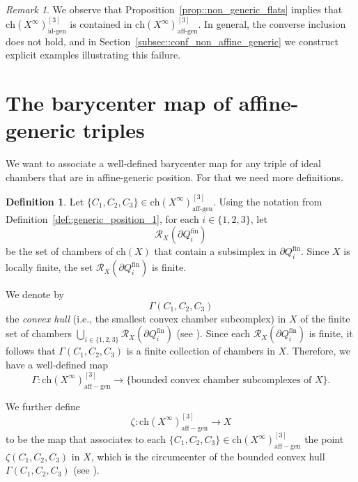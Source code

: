 \documentclass[11pt]{amsart}
\newcommand{\affgen}{\Ch(X^\infty)_{\mathrm{aff-gen}}^{[3]}}
\newcommand{\Ch}{\mathrm{ch}}
\theoremstyle{plain}
\theoremstyle{definition}
\newtheorem{Def}[thm]{Definition}
\theoremstyle{remark}
\newtheorem{rem}[thm]{Remark}
\begin{document}
	
	\begin{rem}
		\label{rem::ideal_affine}
		We observe that Proposition~\ref{prop::non_generic_flats} implies that \(\Ch(X^{\infty})_{\mathrm{id\text{-}gen}}^{[3]}\) is contained in \(\Ch(X^{\infty})_{\mathrm{aff\text{-}gen}}^{[3]}\).  In general, the converse inclusion does not hold, and in Section~\ref{subsec::conf_non_affine_generic} we construct explicit examples illustrating this failure.
	\end{rem}
	
	\section{The barycenter map of affine-generic triples}
	We want to associate a well-defined barycenter map for any triple of ideal chambers that are in affine-generic position. For that we need more definitions.
	
	\begin{Def}
		\label{def::generic_position_convex_hull}
		Let  $\{C_1, C_2, C_3\} \in \Ch(X^\infty)_{\mathrm{aff\text{-}gen}}^{[3]}$.  Using the notation from Definition~\ref{def::generic_position_1}, for each \( i \in \{1,2,3\} \), let  
		\[
		\mathcal{R}_{X}(\partial Q_i^{\mathrm{fin}})
		\]
		be the set of chambers of \(\Ch(X)\) that contain a subsimplex in \(\partial Q_i^{\mathrm{fin}}\). Since \( X \) is locally finite, the set \(\mathcal{R}_{X}(\partial Q_i^{\mathrm{fin}})\) is finite. 
		
		We denote by  
		\[
		\Gamma(C_1, C_2, C_3)
		\]
		the \emph{convex hull} (i.e., the smallest convex chamber subcomplex) in \( X \) of the finite set of chambers  $\bigcup_{i \in \{1,2,3\}} \mathcal{R}_{X}(\partial Q_i^{\mathrm{fin}})$ (see \cite[Examples 3.133.(c)]{abramenko_brown08}). Since each \(\mathcal{R}_{X}(\partial Q_i^{\mathrm{fin}})\) is finite, it follows that \(\Gamma(C_1, C_2, C_3)\) is a finite collection of chambers in \( X \). Therefore, we have a well-defined map  
		\[
		\Gamma : \affgen \longrightarrow \{\text{bounded convex chamber subcomplexes of } X\}.
		\]
		
		We further define  
		\[
		\zeta : \affgen \longrightarrow X
		\]
		to be the map that associates to each  $\{C_1, C_2, C_3\} \in \Ch(X^\infty)_{\mathrm{aff-gen}}^{[3]}$ the point  $
		\zeta(C_1, C_2, C_3)$ in \( X \), which is the circumcenter of the bounded convex hull \(\Gamma(C_1, C_2, C_3)\) (see \cite[Chapter II.2, Proposition 2.7]{bridson_haefliger99}).
	\end{Def}
	
\end{document}
